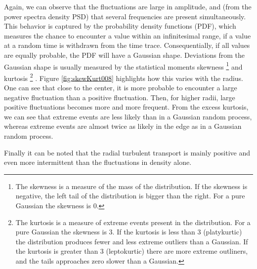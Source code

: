 Again, we can observe that the fluctuations are large in amplitude, and (from the power spectra density PSD) that several frequencies are present simultaneously.
This behavior is captured by the probability density functions (PDF), which measures the chance to encounter a value within an infinitesimal range, if a value at a random time is withdrawn from the time trace.
Consequentially, if all values are equally probable, the PDF will have a Gaussian shape.
Deviations from the Gaussian shape is usually measured by the statistical moments skewness%
%
\footnote{
    The skewness is a measure of the mass of the distribution.
    If the skewness is negative, the left tail of the distribution is bigger than the right.
    For a pure Gaussian the skewness is 0.
}
%
and kurtosis
%
\footnote{
    The kurtosis is a measure of extreme events present in the distribution.
    For a pure Gaussian the skewness is 3.
    If the kurtosis is less than 3 (platykurtic) the distribution produces fewer and less extreme outliers than a Gaussian.
    If the kurtosis is greater than 3 (leptokurtic) there are more extreme outliners, and the tails approaches zero slower than a Gaussian.
}
%
.
Figure \cref{fig:skewKurt008} highlights how this varies with the radius.
One can see that close to the center, it is more probable to encounter a large negative fluctuation than a positive fluctuation.
Then, for higher radii, large positive fluctuations becomes more and more frequent.
From the excess kurtosis, we can see that extreme events are less likely than in a Gaussian random process, whereas extreme events are almost twice as likely in the edge as in a Gaussian random process.

Finally it can be noted that the radial turbulent transport is mainly positive and even more intermittent than the fluctuations in density alone.
